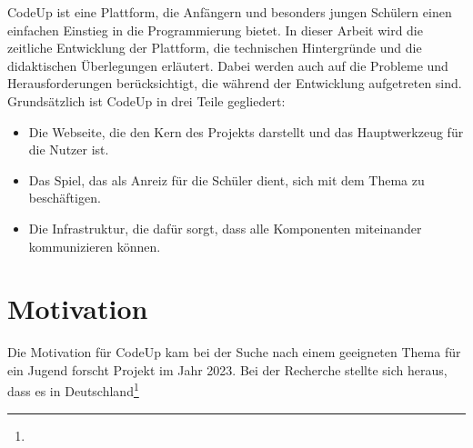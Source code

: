 \documentclass[main.tex]{subfiles}
\begin{document}
    CodeUp ist eine Plattform, die Anfängern und besonders jungen Schülern einen einfachen Einstieg in die Programmierung bietet.
    In dieser Arbeit wird die zeitliche Entwicklung der Plattform, die technischen Hintergründe und die didaktischen Überlegungen erläutert.
    Dabei werden auch auf die Probleme und Herausforderungen berücksichtigt, die während der Entwicklung aufgetreten sind.
    Grundsätzlich ist CodeUp in drei Teile gegliedert:
    \begin{itemize}
        \item Die Webseite, die den Kern des Projekts darstellt und das Hauptwerkzeug für die Nutzer ist.
        \item Das Spiel, das als Anreiz für die Schüler dient, sich mit dem Thema zu beschäftigen.
        \item Die Infrastruktur, die dafür sorgt, dass alle Komponenten miteinander kommunizieren können.
    \end{itemize}
    \section{Motivation}
    Die Motivation für CodeUp kam bei der Suche nach einem geeigneten Thema für ein Jugend forscht Projekt im Jahr 2023.
    Bei der Recherche stellte sich heraus, dass es in Deutschland\footnote{}
\end{document}
